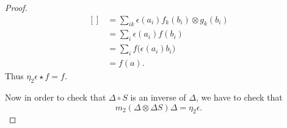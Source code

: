 \begin{proof}
\begin{equation}
\begin{aligned}[]
			                           & =\sum_{ik}\epsilon(a_i)f_k(b_i)\otimes g_k(b_i)                                                                          \\
			                           & =\sum_i\epsilon(a_i)f(b_i)                                                                                               \\
			                           & =\sum_if\big( \epsilon(a_i)b_i\big)                                                                                      \\
			                           & =f(a).
		\end{aligned}
	\end{equation}
	Thus \( \eta_2\epsilon\star f=f\).

	Now in order to check that \( \Delta\circ S\) is an inverse of \( \Delta\), we have to check that
	\begin{equation}
		m_2(\Delta\otimes \Delta S)\Delta=\eta_2\epsilon.
	\end{equation}


\end{proof}
